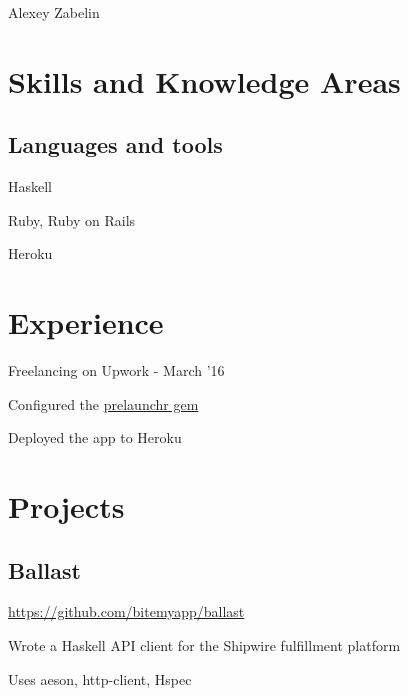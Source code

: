 \documentclass[letterpaper]{article}
\def\name{Alexey Zabelin}
\renewenvironment{itemize}{
  \begin{list}{}{
    \setlength{\leftmargin}{1.5em}
  }
}{
  \end{list}
}
\begin{document}
{\huge \name}


\vspace{0.25in}

\section*{Skills and Knowledge Areas}

\subsection*{Languages and tools}

\begin{itemize}
\item Haskell
\item Ruby, Ruby on Rails
\item Heroku
\end{itemize}


\section*{Experience}

\begin{itemize}
\item Freelancing on Upwork - March '16
  \begin{itemize}
    \item Configured the \hyperlink{https://github.com/harrystech/prelaunchr}{prelaunchr gem}
    \item Deployed the app to Heroku
  \end{itemize}
\end{itemize}


\section*{Projects}

\subsection*{Ballast}

\url{https://github.com/bitemyapp/ballast}

\begin{itemize}
\item Wrote a Haskell API client for the Shipwire fulfillment platform
\item Uses aeson, http-client, Hspec
\end{itemize}
\end{document}
